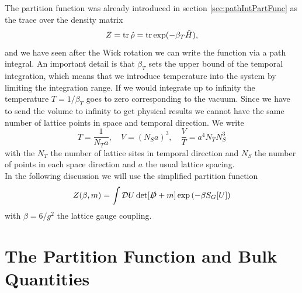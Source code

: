 The partition function was already introduced in section \ref{sec:pathIntPartFunc} as the trace over the density matrix
\begin{equation}
    Z=\operatorname{tr}\hat\rho=\operatorname{tr}\exp(-\beta_T\hat{H}),
\end{equation}
and we have seen after the Wick rotation we can write the function via a path integral. An important detail is that $\beta_T$ sets the upper bound of the temporal integration, which means that we introduce temperature into the system by limiting the integration range. If we would integrate up to infinity the temperature $T=1/\beta_T$ goes to zero corresponding to the vacuum. Since we have to send the volume to infinity to get physical results we cannot have the same number of lattice points in space and temporal direction. We write
\begin{equation}
    T=\frac{1}{N_Ta},\quad V=(N_Sa)^3,\quad \frac{V}{T}=a^4N_TN_S^3
\end{equation}
with the $N_T$ the number of lattice sites in temporal direction and $N_S$ the number of points in each space direction and $a$ the usual lattice spacing.\\
In the following discussion we will use the simplified partition function
\begin{equation}
    Z(\beta,m)=\int \mathcal DU \det[\slashed D+m]\exp\left(-\beta S_G[U]\right)\label{eq:simpleZ}
\end{equation}
with $\beta=6/g^2$ the lattice gauge coupling.
\section{The Partition Function and Bulk Quantities}

